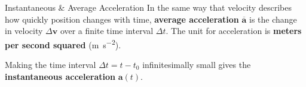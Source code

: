 \documentclass[12pt,compress,aspectratio=169]{beamer}
\begin{document}


\begin{frame}{Instantaneous \& Average Acceleration}
  In the same way that velocity describes how quickly position changes with time, 
  \textbf{average acceleration} $\overline{\bm{a}}$ is the change in velocity
  $\Delta\bm{v}$ over a finite time interval $\Delta t$. The unit for
  acceleration is \textbf{meters per second squared}
  (\si{\metre\per\second\squared}).

  
  Making the time interval $\Delta t=t-t_0$ infinitesimally small gives the
  \textbf{instantaneous acceleration} $\bm{a}(t)$.
\end{frame}



%
%
%
%
%
%    
%
%
\end{document}
